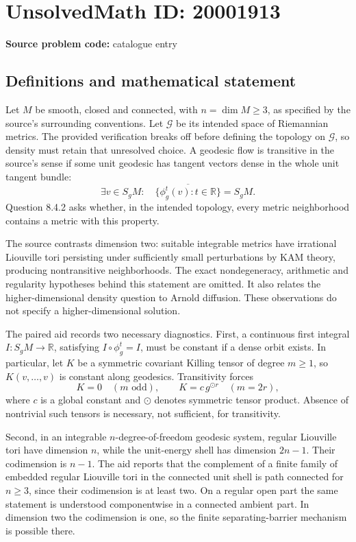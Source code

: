 \documentclass[11pt]{article}
\begin{document}
\section*{UnsolvedMath ID: 20001913}
\textbf{Source problem code:} catalogue entry
\subsection{Definitions and mathematical statement}
Let \(M\) be smooth, closed and connected, with \(n=\dim M\geq3\), as specified by the source's surrounding conventions. Let \(\mathcal G\) be its intended space of Riemannian metrics. The provided verification breaks off before defining the topology on \(\mathcal G\), so density must retain that unresolved choice. A geodesic flow is transitive in the source's sense if some unit geodesic has tangent vectors dense in the whole unit tangent bundle:
\[
 \exists v\in S_gM:\quad
 \overline{\{\phi_g^t(v):t\in\mathbb R\}}=S_gM.
\]
Question 8.4.2 asks whether, in the intended topology, every metric neighborhood contains a metric with this property.

The source contrasts dimension two: suitable integrable metrics have irrational Liouville tori persisting under sufficiently small perturbations by KAM theory, producing nontransitive neighborhoods. The exact nondegeneracy, arithmetic and regularity hypotheses behind this statement are omitted. It also relates the higher-dimensional density question to Arnold diffusion. These observations do not specify a higher-dimensional solution.

The paired aid records two necessary diagnostics. First, a continuous first integral \(I:S_gM\to\mathbb R\), satisfying \(I\circ\phi_g^t=I\), must be constant if a dense orbit exists. In particular, let \(K\) be a symmetric covariant Killing tensor of degree \(m\geq1\), so \(K(v,\ldots,v)\) is constant along geodesics. Transitivity forces
\[
 K=0\quad(m\text{ odd}),\qquad
 K=c\,g^{\odot r}\quad(m=2r),
\]
where \(c\) is a global constant and \(\odot\) denotes symmetric tensor product. Absence of nontrivial such tensors is necessary, not sufficient, for transitivity.

Second, in an integrable \(n\)-degree-of-freedom geodesic system, regular Liouville tori have dimension \(n\), while the unit-energy shell has dimension \(2n-1\). Their codimension is \(n-1\). The aid reports that the complement of a finite family of embedded regular Liouville tori in the connected unit shell is path connected for \(n\geq3\), since their codimension is at least two. On a regular open part the same statement is understood componentwise in a connected ambient part. In dimension two the codimension is one, so the finite separating-barrier mechanism is possible there.
\end{document}

